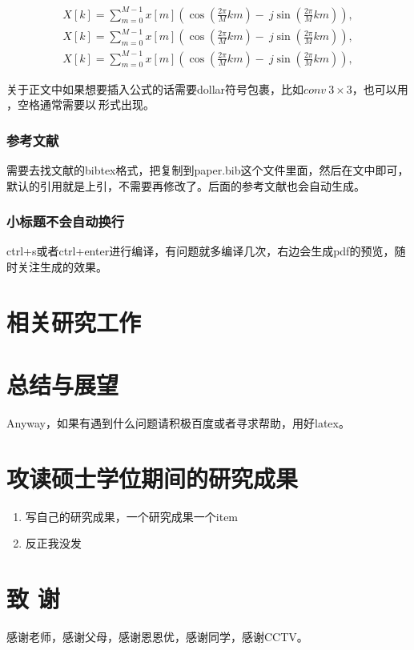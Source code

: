 \documentclass[12pt, a4paper]{article}
\begin{document}
\begin{equation}
    \begin{aligned}
        X\left[ k \right] =\sum_{m=0}^{M-1}{x\left[ m \right] \left( \cos \left( \frac{2\pi}{M}km \right) -\ j\sin \left( \frac{2\pi}{M}km \right) \right)},\\
        X\left[ k \right] =\sum_{m=0}^{M-1}{x\left[ m \right] \left( \cos \left( \frac{2\pi}{M}km \right) -\ j\sin \left( \frac{2\pi}{M}km \right) \right)},\\
        X\left[ k \right] =\sum_{m=0}^{M-1}{x\left[ m \right] \left( \cos \left( \frac{2\pi}{M}km \right) -\ j\sin \left( \frac{2\pi}{M}km \right) \right)},
    \end{aligned}
\end{equation}

关于正文中如果想要插入公式的话需要dollar符号包裹，比如$ conv\ 3 \times 3$，也可以用\( \)，空格通常需要以$\ $形式出现。

\subsubsection{参考文献}需要去找文献的bibtex格式，把复制到paper.bib这个文件里面，然后在文中\cite{nussbaumer1982fast}即可，默认的引用就是上引，不需要再修改了。后面的参考文献也会自动生成。

\subsubsection{小标题不会自动换行}ctrl+s或者ctrl+enter进行编译，有问题就多编译几次，右边会生成pdf的预览，随时关注生成的效果。


\newpage%


\section{相关研究工作}
\newpage

\section{总结与展望}
Anyway，如果有遇到什么问题请积极百度或者寻求帮助，用好latex。
\newpage

{\centering\section*{攻读硕士学位期间的研究成果}}
\begin{enumerate}
    \item 写自己的研究成果，一个研究成果一个item
    \item 反正我没发
\end{enumerate}

\newpage


\newpage
{}
{\centering\section*{致 \quad 谢}}

感谢老师，感谢父母，感谢恩恩优，感谢同学，感谢CCTV。
\end{document}
